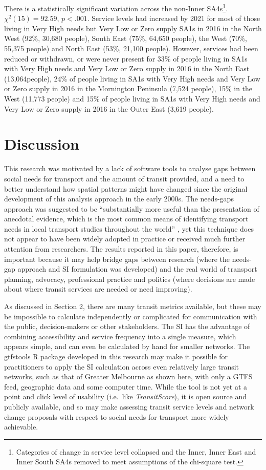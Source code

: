 \documentclass[preprint, 3p,
authoryear]{elsarticle} %
\begin{document}
There is a statistically significant variation across the non-Inner
SA4s\footnote{Categories of change in service level collapsed and the
  Inner, Inner East and Inner South SA4s removed to meet assumptions of
  the chi-square test.}. \(\chi^2(15) = 92.59\), \(p < .001\). Service
levels had increased by 2021 for most of those living in Very High needs
but Very Low or Zero supply SA1s in 2016 in the North West (92\%, 30,680
people), South East (75\%, 64,650 people), the West (70\%, 55,375
people) and North East (53\%, 21,100 people). However, services had been
reduced or withdrawn, or were never present for 33\% of people living in
SA1s with Very High needs and Very Low or Zero supply in 2016 in the
North East (13,064people), 24\% of people living in SA1s with Very High
needs and Very Low or Zero supply in 2016 in the Mornington Peninsula
(7,524 people), 15\% in the West (11,773 people) and 15\% of people
living in SA1s with Very High needs and Very Low or Zero supply in 2016
in the Outer East (3,619 people).

\section{Discussion}\label{discussion}

This research was motivated by a lack of software tools to analyse gaps
between social needs for transport and the amount of transit provided,
and a need to better understand how spatial patterns might have changed
since the original development of this analysis approach in the early
2000s. The needs-gaps approach was suggested to be ``substantially more
useful than the presentation of anecdotal evidence, which is the most
common means of identifying transport needs in local transport studies
throughout the world'' \citep{currie2010identifying}, yet this technique
does not appear to have been widely adopted in practice or received much
further attention from researchers. The results reported in this paper,
therefore, is important because it may help bridge gaps between research
(where the needs-gap approach and SI formulation was developed) and the
real world of transport planning, advocacy, professional practice and
politics (where decisions are made about where transit services are
needed or need improving).

As discussed in Section 2, there are many transit metrics available, but
these may be impossible to calculate independently or complicated for
communication with the public, decision-makers or other stakeholders.
The SI has the advantage of combining accessibility and service
frequency into a single measure, which appears simple, and can even be
calculated by hand for smaller networks. The gtfstools R package
developed in this research may make it possible for practitioners to
apply the SI calculation across even relatively large transit networks,
such as that of Greater Melbourne as shown here, with only a GTFS feed,
geographic data and some computer time. While the tool is not yet at a
point and click level of usability (i.e.~like \emph{TransitScore}), it
is open source and publicly available, and so may make assessing transit
service levels and network change proposals with respect to social needs
for transport more widely achievable.
\end{document}
